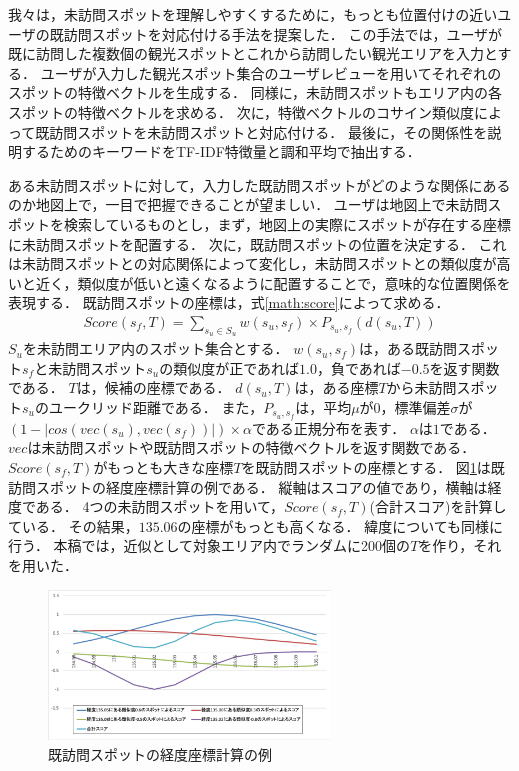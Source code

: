 \documentclass{deimj}
\begin{document}
我々は，未訪問スポットを理解しやすくするために，もっとも位置付けの近いユーザの既訪問スポットを対応付ける手法を提案した\cite{潘}．
この手法では，ユーザが既に訪問した複数個の観光スポットとこれから訪問したい観光エリアを入力とする．
ユーザが入力した観光スポット集合のユーザレビューを用いてそれぞれのスポットの特徴ベクトルを生成する．
同様に，未訪問スポットもエリア内の各スポットの特徴ベクトルを求める．
次に，特徴ベクトルのコサイン類似度によって既訪問スポットを未訪問スポットと対応付ける．
最後に，その関係性を説明するためのキーワードをTF-IDF特徴量と調和平均で抽出する．

ある未訪問スポットに対して，入力した既訪問スポットがどのような関係にあるのか地図上で，一目で把握できることが望ましい．
ユーザは地図上で未訪問スポットを検索しているものとし，まず，地図上の実際にスポットが存在する座標に未訪問スポットを配置する．
次に，既訪問スポットの位置を決定する．
これは未訪問スポットとの対応関係によって変化し，未訪問スポットとの類似度が高いと近く，類似度が低いと遠くなるように配置することで，意味的な位置関係を表現する．
既訪問スポットの座標は，式\ref{math:score}によって求める．
\begin{eqnarray}
Score(s_f,T) = \sum_{s_u \in S_u}^{} w(s_u,s_f) \times P_{s_u,s_f}(d(s_u,T))
    \label{math:score}
\end{eqnarray}
$S_u$を未訪問エリア内のスポット集合とする．
$w(s_u,s_f)$は，ある既訪問スポット$s_f$と未訪問スポット$s_u$の類似度が正であれば$1.0$，負であれば$-0.5$を返す関数である．
$T$は，候補の座標である．
$d(s_u,T)$は，ある座標$T$から未訪問スポット$s_u$のユークリッド距離である．
また，$P_{s_u,s_f}$は，平均$\mu$が$0$，標準偏差$\sigma$が$(1-|cos(vec(s_u),vec(s_f))|) \times \alpha$である正規分布を表す．
$\alpha$は$1$である．
$vec$は未訪問スポットや既訪問スポットの特徴ベクトルを返す関数である．
$Score(s_f,T)$がもっとも大きな座標$T$を既訪問スポットの座標とする．
図\ref{fig:image}は既訪問スポットの経度座標計算の例である．
縦軸はスコアの値であり，横軸は経度である．
4つの未訪問スポットを用いて，$Score(s_f,T)$(合計スコア)を計算している．
その結果，$135.06$の座標がもっとも高くなる．
緯度についても同様に行う．
本稿では，近似として対象エリア内でランダムに200個の$T$を作り，それを用いた．

\begin{figure}[t]
  \begin{center}
    \includegraphics[clip,width=7.5cm]{picture/score_image2.png}
    \caption{既訪問スポットの経度座標計算の例}
    \label{fig:image}
   \end{center}
\end{figure}
\end{document}
